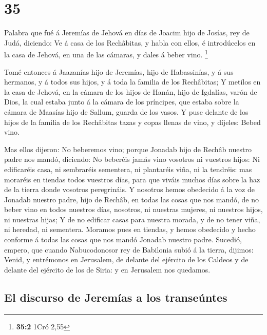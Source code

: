 \hypertarget{section-34}{%
\section{35}\label{section-34}}

 Palabra que fué á Jeremías de Jehová en días de Joacim
hijo de Josías, rey de Judá, diciendo:  Ve á casa de los
Rechâbitas, y habla con ellos, é introdúcelos en la casa de Jehová, en
una de las cámaras, y dales á beber vino. \footnote{\textbf{35:2} 1Cró
  2,55}

 Tomé entonces á Jaazanías hijo de Jeremías, hijo de
Habassinías, y á sus hermanos, y á todos sus hijos, y á toda la familia
de los Rechâbitas;  Y metílos en la casa de Jehová, en la
cámara de los hijos de Hanán, hijo de Igdalías, varón de Dios, la cual
estaba junto á la cámara de los príncipes, que estaba sobre la cámara de
Maasías hijo de Sallum, guarda de los vasos.  Y puse
delante de los hijos de la familia de los Rechâbitas tazas y copas
llenas de vino, y díjeles: Bebed vino.

 Mas ellos dijeron: No beberemos vino; porque Jonadab hijo
de Rechâb nuestro padre nos mandó, diciendo: No beberéis jamás vino
vosotros ni vuestros hijos:  Ni edificaréis casa, ni
sembraréis sementera, ni plantaréis viña, ni la tendréis: mas moraréis
en tiendas todos vuestros días, para que viváis muchos días sobre la haz
de la tierra donde vosotros peregrináis.  Y nosotros hemos
obedecido á la voz de Jonadab nuestro padre, hijo de Rechâb, en todas
las cosas que nos mandó, de no beber vino en todos nuestros días,
nosotros, ni nuestras mujeres, ni nuestros hijos, ni nuestras hijas;
 Y de no edificar casas para nuestra morada, y de no tener
viña, ni heredad, ni sementera.  Moramos pues en tiendas,
y hemos obedecido y hecho conforme á todas las cosas que nos mandó
Jonadab nuestro padre.  Sucedió, empero, que cuando
Nabucodonosor rey de Babilonia subió á la tierra, dijimos: Venid, y
entrémonos en Jerusalem, de delante del ejército de los Caldeos y de
delante del ejército de los de Siria: y en Jerusalem nos quedamos.

\hypertarget{el-discurso-de-jeremuxedas-a-los-transeuxfantes}{%
\subsection{El discurso de Jeremías a los
transeúntes}\label{el-discurso-de-jeremuxedas-a-los-transeuxfantes}}

